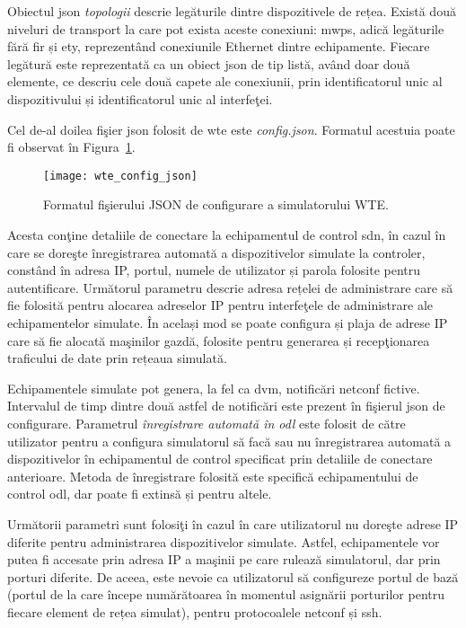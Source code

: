 Obiectul \gls{json} \textit{topologii} descrie legăturile dintre dispozitivele de rețea. Există două niveluri de transport la care pot exista aceste conexiuni: \gls{mwps}, adică legăturile fără fir și \gls{ety}, reprezentând conexiunile Ethernet dintre echipamente. Fiecare legătură este reprezentată ca un obiect \gls{json} de tip listă, având doar două elemente, ce descriu cele două capete ale conexiunii, prin identificatorul unic al dispozitivului și identificatorul unic al interfeţei.

Cel de-al doilea fişier \gls{json} folosit de \gls{wte} este \textit{config.json}. Formatul acestuia poate fi observat în Figura~\ref{fig:wte_config_json}.

\begin{figure}[h]
	\centering
	\texttt{[image: wte\_config\_json]}
	\caption{Formatul fişierului JSON de configurare a simulatorului WTE.}
	\label{fig:wte_config_json}
\end{figure}

Acesta conţine detaliile de conectare la echipamentul de control \gls{sdn}, în cazul în care se doreşte înregistrarea automată a dispozitivelor simulate la controler, constând în adresa IP, portul, numele de utilizator și parola folosite pentru autentificare. Următorul parametru descrie adresa rețelei de administrare care să fie folosită pentru alocarea adreselor IP pentru interfeţele de administrare ale echipamentelor simulate. În același mod se poate configura și plaja de adrese IP care să fie alocată maşinilor gazdă, folosite pentru generarea și recepţionarea traficului de date prin rețeaua simulată. 

Echipamentele simulate pot genera, la fel ca \gls{dvm}, notificări \gls{netconf} fictive. Intervalul de timp dintre două astfel de notificări este prezent în fişierul \gls{json} de configurare. Parametrul \textit{înregistrare automată în \gls{odl}} este folosit de către utilizator pentru a configura simulatorul să facă sau nu înregistrarea automată a dispozitivelor în echipamentul de control specificat prin detaliile de conectare anterioare. Metoda de înregistrare folosită este specifică echipamentului de control \gls{odl}, dar poate fi extinsă și pentru altele.

Următorii parametri sunt folosiţi în cazul în care utilizatorul nu doreşte adrese IP diferite pentru administrarea dispozitivelor simulate. Astfel, echipamentele vor putea fi accesate prin adresa IP a maşinii pe care rulează simulatorul, dar prin porturi diferite. De aceea, este nevoie ca utilizatorul să configureze portul de bază (portul de la care începe numărătoarea în momentul asignării porturilor pentru fiecare element de rețea simulat), pentru protocoalele \gls{netconf} și \gls{ssh}.

